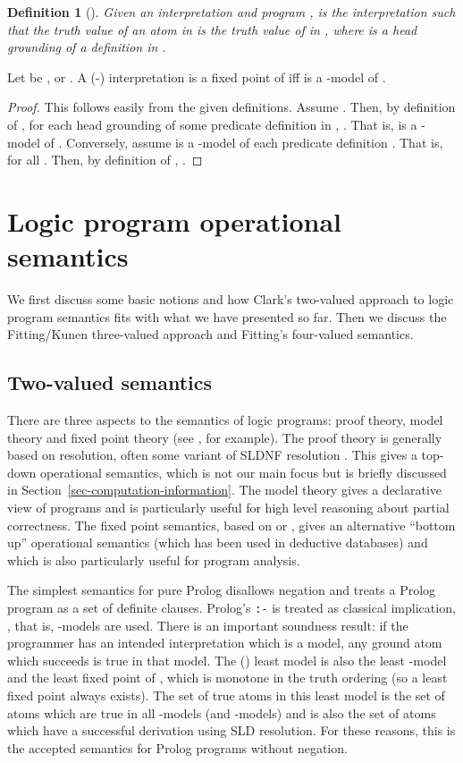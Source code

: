 \documentclass{tlp}
\newtheorem{definition}{Definition}
\begin{document}
\begin{definition}[] \rm
Given an interpretation  and program ,  is the
interpretation  such that the truth value of an atom  in  is
the truth value of  in , where  is a head grounding of a
definition in .
\end{definition}


\begin{proposition} \rm
Let  be ,  or .
A (-) interpretation  is a fixed point of  
iff  is a -model of .
\end{proposition}
\begin{proof}
This follows easily from the given definitions.
Assume .
Then, by definition of , for each head grounding 
of some predicate definition in , .
That is,  is a -model of .
Conversely, assume  is a -model of each predicate
definition .
That is,  for all .
Then, by definition of , .
\end{proof}


\section{Logic program operational semantics}
\label{sec-lp-semantics}

We first discuss some basic notions and how Clark's two-valued approach
to logic program semantics fits with what we have presented so far.
Then we discuss the Fitting/Kunen three-valued approach and Fitting's
four-valued semantics.

\subsection{Two-valued semantics}
\label{sec-clark}

There are three aspects to the semantics of logic programs: proof
theory, model theory and fixed point theory (see ,
for example).  The proof theory is generally based on resolution,
often some variant of SLDNF resolution \cite{Cla78}.  This gives a
top-down operational semantics, which is not our main focus but is
briefly discussed in Section~\ref{sec-computation-information}.
The model theory gives a declarative view of programs and is particularly
useful for high level reasoning about partial correctness.  The fixed
point semantics, based on  or , gives an alternative 
``bottom up'' operational semantics (which has been used in deductive
databases) and which is also particularly useful for program analysis.

The simplest semantics for pure Prolog disallows negation and treats a
Prolog program as a set of definite clauses.  Prolog's \texttt{:-} is
treated as classical implication, , that is, -models
are used.  There is an important soundness result: if the programmer
has an intended interpretation which is a model, any ground atom which
succeeds is true in that model.  The () least model is also the
least -model and the least fixed point of , which is
monotone in the truth ordering (so a least fixed point always exists).
The set of true atoms in this least model is the set of atoms which are
true in all -models (and -models) and is also the set of
atoms which have a successful derivation using SLD resolution. 
For these reasons, this is the accepted
semantics for Prolog programs without negation.
\end{document}

